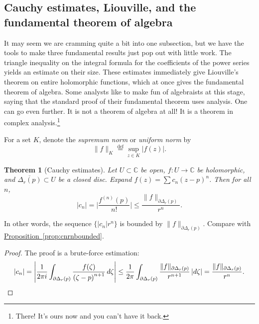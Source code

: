 \documentclass[12pt,openany]{book}
\newcommand{\glsadd}[2][]{}
\newcommand{\sabs}[1]{\lvert {#1} \rvert}
\newcommand{\snorm}[1]{\lVert {#1} \rVert}
\newcommand{\bbabs}[1]{\biggl\lvert {#1} \biggr\rvert}
\newcommand{\abs}[1]{\left\lvert {#1} \right\rvert}
\newcommand{\C}{{\mathbb{C}}}
\newcommand{\myindex}[1]{#1\index{#1}}
\theoremstyle{plain}
\newtheorem{thm}{Theorem}[section]
\theoremstyle{remark}
\theoremstyle{definition}
\theoremstyle{exercise}
\theoremstyle{example}
\newcommand{\propref}[1]{\hyperref[#1]{Proposition~\ref*{#1}}}
\begin{document}
\subsection{Cauchy estimates, Liouville, and the fundamental theorem of
algebra}

It may seem we are cramming quite a bit into one subsection, but
we have the tools to make three fundamental results just pop out
with little work.  The triangle inequality on
the integral formula for the coefficients of the power series yields an
estimate on their size.  These estimates immediately give
Liouville's theorem on entire holomorphic functions, which at once gives the
fundamental theorem of algebra.
Some analysts like to make fun of algebraists at this stage, saying that the
standard proof of their fundamental theorem uses analysis.
One can go even further.
It is not a theorem of algebra at all!
It is a theorem in
complex analysis.\footnote{There! It's ours now and you can't have it back.}

For a set $K$, denote the \emph{\myindex{supremum norm}} or
\emph{\myindex{uniform norm}} by
\glsadd{not:uniformnorm}%
\begin{equation*}
\snorm{f}_K
\overset{\text{def}}{=}
\sup_{z \in K} \sabs{f(z)} .
\end{equation*}

\begin{thm}[Cauchy estimates]
Let $U \subset \C$ be open, $f \colon U \to \C$ be
holomorphic, and $\overline{\Delta_r(p)} \subset U$
be a closed disc.  Expand $f(z) = \sum c_n {(z-p)}^n$.
Then for all $n$,
\begin{equation*}
\sabs{c_n} =
\bbabs{\frac{f^{(n)}(p)}{n!}}
\leq
\frac{\snorm{f}_{\partial \Delta_r(p)}}{r^{n}} .
\end{equation*}
\end{thm}

In other words, the sequence $\bigl\{ \sabs{c_n} r^n \bigr\}$ is bounded by
$\snorm{f}_{\partial \Delta_r(p)}$.  Compare with \propref{prop:cnrnbounded}.

\begin{proof}
The proof is a brute-force estimation:
\begin{equation*}
\sabs{c_n}  = 
\abs{
\frac{1}{2\pi i}
\int_{\partial \Delta_r(p)}
\frac{f(\zeta)}{{(\zeta-p)}^{n+1}}
\,
d \zeta 
}
\leq
\frac{1}{2\pi}
\int_{\partial \Delta_r(p)}
\frac{\snorm{f}_{\partial \Delta_r(p)}}{r^{n+1}}
\,
\sabs{d \zeta} 
=
\frac{\snorm{f}_{\partial \Delta_r(p)}}{r^{n}} .
\qedhere
\end{equation*}
\end{proof}
\end{document}
